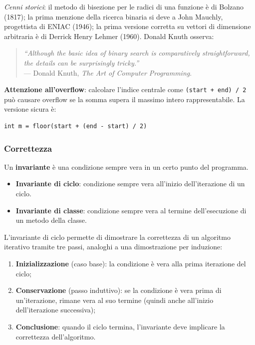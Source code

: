 \documentclass[12pt, a4paper]{article}
\begin{document}
\textit{Cenni storici}: il metodo di bisezione per le radici di una funzione è di Bolzano (1817); la prima menzione della ricerca binaria si deve a John Mauchly, progettista di ENIAC (1946); la prima versione corretta su vettori di dimensione arbitraria è di Derrick Henry Lehmer (1960). Donald Knuth osserva:
\begin{quote}
\textit{``Although the basic idea of binary search is comparatively straightforward, the details can be surprisingly tricky.''} \\
--- Donald Knuth, \textit{The Art of Computer Programming}.
\end{quote}

\textbf{Attenzione all'overflow}: calcolare l'indice centrale come \texttt{(start + end) / 2} può causare overflow se la somma supera il massimo intero rappresentabile. La versione sicura è:
\begin{verbatim}
int m = floor(start + (end - start) / 2)
\end{verbatim}

\subsubsection{Correttezza}

\begin{tcolorbox}[colback=lightergray!10, colframe=tocsec, title=\textbf{Definizione: Invariante}]
\label{def:invariante}
Un \textbf{invariante} è una condizione sempre vera in un certo punto del programma.
\begin{itemize}
    \item \textbf{Invariante di ciclo}: condizione sempre vera all'inizio dell'iterazione di un ciclo.
    \item \textbf{Invariante di classe}: condizione sempre vera al termine dell'esecuzione di un metodo della classe.
\end{itemize}
\end{tcolorbox}

L'invariante di ciclo permette di dimostrare la correttezza di un algoritmo iterativo tramite tre passi, analoghi a una dimostrazione per induzione:
\begin{enumerate}
    \item \textbf{Inizializzazione} (caso base): la condizione è vera alla prima iterazione del ciclo;
    \item \textbf{Conservazione} (passo induttivo): se la condizione è vera prima di un'iterazione, rimane vera al suo termine (quindi anche all'inizio dell'iterazione successiva);
    \item \textbf{Conclusione}: quando il ciclo termina, l'invariante deve implicare la correttezza dell'algoritmo.
\end{enumerate}
\end{document}
